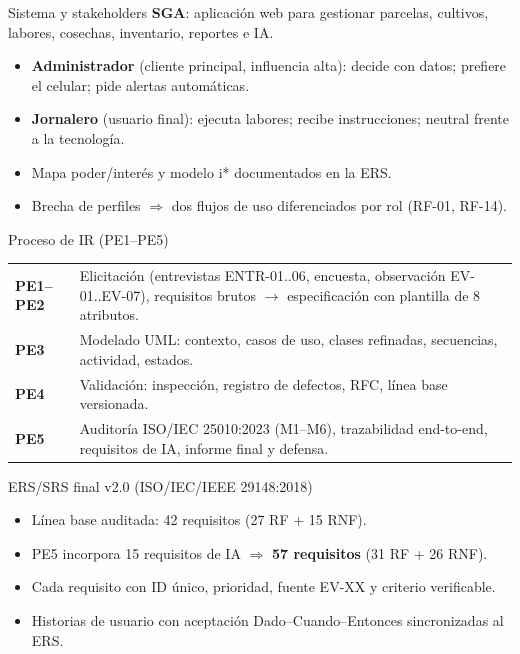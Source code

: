 \documentclass[12pt,aspectratio=169]{beamer}
\begin{document}
\begin{frame}{Sistema y stakeholders}
  \textbf{SGA}: aplicaci\'on web para gestionar parcelas, cultivos, labores, cosechas, inventario, reportes e IA.
  \begin{itemize}
    \item \textbf{Administrador} (cliente principal, influencia alta): decide con datos; prefiere el celular; pide alertas autom\'aticas.
    \item \textbf{Jornalero} (usuario final): ejecuta labores; recibe instrucciones; neutral frente a la tecnolog\'ia.
    \item Mapa poder/inter\'es y modelo i* documentados en la ERS.
    \item Brecha de perfiles $\Rightarrow$ dos flujos de uso diferenciados por rol (RF-01, RF-14).
  \end{itemize}
\end{frame}

\begin{frame}{Proceso de IR (PE1--PE5)}
  \small
  \begin{tabular}{@{}p{2.2cm}@{\;}p{10.6cm}@{}}
    \textbf{PE1--PE2} & Elicitaci\'on (entrevistas ENTR-01..06, encuesta, observaci\'on EV-01..EV-07), requisitos brutos $\rightarrow$ especificaci\'on con plantilla de 8 atributos. \\
    \textbf{PE3} & Modelado UML: contexto, casos de uso, clases refinadas, secuencias, actividad, estados. \\
    \textbf{PE4} & Validaci\'on: inspecci\'on, registro de defectos, RFC, l\'inea base versionada. \\
    \textbf{PE5} & Auditor\'ia ISO/IEC 25010:2023 (M1--M6), trazabilidad end-to-end, requisitos de IA, informe final y defensa. \\
  \end{tabular}
\end{frame}

\begin{frame}{ERS/SRS final v2.0 (ISO/IEC/IEEE 29148:2018)}
  \begin{itemize}
    \item L\'inea base auditada: 42 requisitos (27 RF + 15 RNF).
    \item PE5 incorpora 15 requisitos de IA $\Rightarrow$ \textbf{57 requisitos} (31 RF + 26 RNF).
    \item Cada requisito con ID \'unico, prioridad, fuente EV-XX y criterio verificable.
    \item Historias de usuario con aceptaci\'on Dado--Cuando--Entonces sincronizadas al ERS.
  \end{itemize}
\end{frame}
\end{document}
